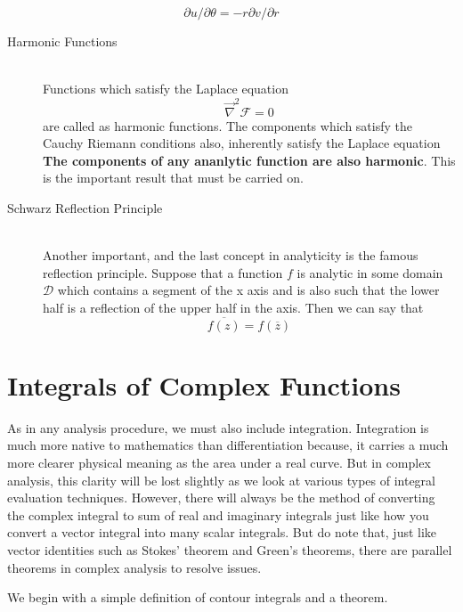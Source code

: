 \documentclass[11pt]{article}
\begin{document}
\begin{sloppypar}
\begin{equation}
	\end{equation}
	\begin{equation}
	\partial u/\partial \theta = -r\partial v/\partial r
\end{equation}
\begin{description}
\item[Harmonic Functions] \hfill \\
	Functions which satisfy the Laplace equation
	$$\vec \nabla^2 \mathcal{F} = 0$$ are called as harmonic functions. The components which satisfy the Cauchy Riemann conditions also, inherently satisfy the Laplace equation
	\textbf{The components of any ananlytic function are also harmonic}. This is the important result that must be carried on. 
\item[Schwarz Reflection Principle] \hfill \\
	Another important, and the last concept in analyticity is the famous reflection principle. Suppose that a function $f$ is analytic in some domain $\mathcal{D}$ which contains a segment of the x axis and is also such that the lower half is a reflection of the upper half in the axis. Then we can say that
	$$\overline{f(z)} = f(\overline{z})$$
\end{description}

\section{Integrals of Complex Functions}
As in any analysis procedure, we must also include integration. Integration is much more native to mathematics than differentiation because, it carries a much more clearer physical meaning as the area under a real curve. But in complex analysis, this clarity will be lost slightly as we look at various types of integral evaluation techniques. However, there will always be the method of converting the complex integral to sum of real and imaginary integrals just like how you convert a vector integral into many scalar integrals. But do note that, just like vector identities such as Stokes\rq{} theorem and Green\rq{}s theorems, there are parallel theorems in complex analysis to resolve issues.

We begin with a simple definition of contour integrals and a theorem.


\end{sloppypar}
\end{document}
